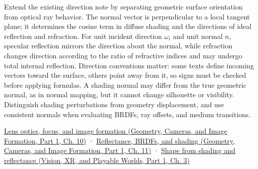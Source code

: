 \hypertarget{appendix-44e00863b4d5-university-course-development}{}

Extend the existing direction note by separating geometric surface orientation from optical ray behavior. The normal vector is perpendicular to a local tangent plane; it determines the cosine term in diffuse shading and the directions of ideal reflection and refraction. For unit incident direction \(\omega_i\) and unit normal \(n\), specular reflection mirrors the direction about the normal, while refraction changes direction according to the ratio of refractive indices and may undergo total internal reflection. Direction conventions matter: some texts define incoming vectors toward the surface, others point away from it, so signs must be checked before applying formulas. A shading normal may differ from the true geometric normal, as in normal mapping, but it cannot change silhouette or visibility. Distinguish shading perturbations from geometry displacement, and use consistent normals when evaluating BRDFs, ray offsets, and medium transitions.

\href{../03-Geometry-Cameras-and-Image-Formation-P01/main.pdf\#03-visual-computing-i-ch003-lens-optics-focus-and-image-formation}{Lens optics, focus, and image formation (Geometry, Cameras, and Image Formation, Part 1, Ch. 10)} · \href{../03-Geometry-Cameras-and-Image-Formation-P01/main.pdf\#03-visual-computing-i-ch004-reflectance-brdfs-and-shading}{Reflectance, BRDFs, and shading (Geometry, Cameras, and Image Formation, Part 1, Ch. 11)} · \href{../07-Vision-XR-and-Playable-Worlds-P01/main.pdf\#04-visual-computing-ii-ch032-shape-from-shading-and-reflectance}{Shape from shading and reflectance (Vision, XR, and Playable Worlds, Part 1, Ch. 3)}
